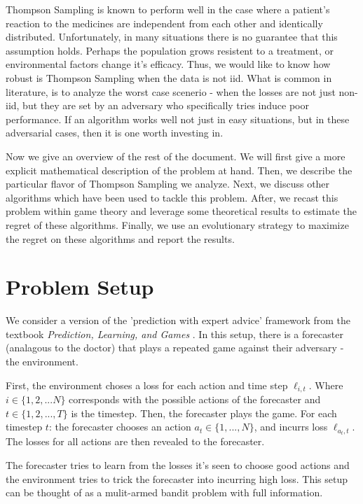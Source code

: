 \documentclass[10pt,a4paper]{article} %
\begin{document}
	Thompson Sampling is known to perform well in the case where a patient's reaction to the medicines are independent from each other and identically distributed.  Unfortunately, in many situations there is no guarantee that this assumption holds.  Perhaps the population grows resistent to a treatment, or environmental factors change it's efficacy.  Thus, we would like to know how robust is Thompson Sampling when the data is not iid.  What is common in literature, is to analyze the worst case scenerio - when the losses are not just non-iid, but they are set by an adversary who specifically tries induce poor performance.  If an algorithm works well not just in easy situations, but in these adversarial cases, then it is one worth investing in.
	
	Now we give an overview of the rest of the document.  We will first give a more explicit mathematical description of the problem at hand.  Then, we describe the particular flavor of Thompson Sampling we analyze.  Next, we discuss other algorithms which have been used to tackle this problem.  After, we recast this problem within game theory and leverage some theoretical results to estimate the regret of these algorithms.  Finally, we use an evolutionary strategy to maximize the regret on these algorithms and report the results.
	
	\section{Problem Setup}
	
	We consider a version of the 'prediction with expert advice' framework from the textbook \textit{Prediction, Learning, and Games} \cite{PLG}.  In this setup, there is a forecaster (analagous to the doctor) that plays a repeated game against their adversary - the environment.  
	
	First, the environment choses a loss for each action and time step $\ell_{i, t}$.  Where $i \in \{1, 2, ... N\}$ corresponds with the possible actions  of the forecaster and $t \in \{1, 2, ..., T\}$ is the timestep.  Then, the forecaster plays the game.  For each timestep $t$: the forecaster chooses an action $a_t \in \{1, ..., N\}$, and incurrs loss $\ell_{a_t, t}$.  The losses for all actions are then revealed to the forecaster. 
	
	The forecaster tries to learn from the losses it's seen to choose good actions and the environment tries to trick the forecaster into incurring high loss.  This setup can be thought of as a mulit-armed bandit problem with full information.
	
\end{document}

